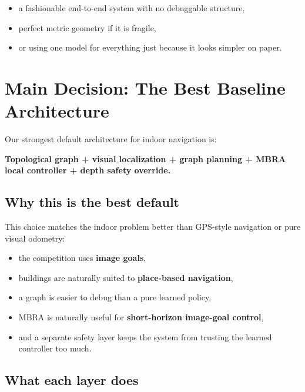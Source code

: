 \documentclass[11pt,a4paper]{article}
\begin{document}
\begin{itemize}[nosep]
  \item a fashionable end-to-end system with no debuggable structure,
  \item perfect metric geometry if it is fragile,
  \item or using one model for everything just because it looks simpler on paper.
\end{itemize}


\section{Main Decision: The Best Baseline Architecture}

Our strongest default architecture for indoor navigation is:

\begin{mdframed}
\textbf{Topological graph + visual localization + graph planning + MBRA local
controller + depth safety override.}
\end{mdframed}

\subsection{Why this is the best default}

This choice matches the indoor problem better than GPS-style navigation or pure
visual odometry:
\begin{itemize}[nosep]
  \item the competition uses \textbf{image goals},
  \item buildings are naturally suited to \textbf{place-based navigation},
  \item a graph is easier to debug than a pure learned policy,
  \item MBRA is naturally useful for \textbf{short-horizon image-goal control},
  \item and a separate safety layer keeps the system from trusting the learned
        controller too much.
\end{itemize}

\subsection{What each layer does}
\end{document}
